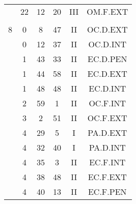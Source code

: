 \documentclass[12pt, a4paper]{article}
\begin{document}
\begin{multicols}{3}
{\begin{tabular}{c c c c c c}
	 	 	 	 & 22 & 12 & 20 & III & OM.F.EXT\\%
	 	 	 	 & & & & & \\%
	 	 	 	8 & 0 & 8 & 47 & II & OC.D.EXT\\%
	 	 	 	 & 0 & 12 & 37 & II & OC.D.INT\\%
	 	 	 	 & 1 & 43 & 33 & II & EC.D.PEN\\%
	 	 	 	 & 1 & 44 & 58 & II & EC.D.EXT\\%
	 	 	 	 & 1 & 48 & 48 & II & EC.D.INT\\%
	 	 	 	 & 2 & 59 & 1 & II & OC.F.INT\\%
	 	 	 	 & 3 & 2 & 51 & II & OC.F.EXT\\%
	 	 	 	 & 4 & 29 & 5 & I & PA.D.EXT\\%
	 	 	 	 & 4 & 32 & 40 & I & PA.D.INT\\%
	 	 	 	 & 4 & 35 & 3 & II & EC.F.INT\\%
	 	 	 	 & 4 & 38 & 48 & II & EC.F.EXT\\%
	 	 	 	 & 4 & 40 & 13 & II & EC.F.PEN\\%
	 	 \end{tabular}
 	}
\end{multicols}
\end{document}

